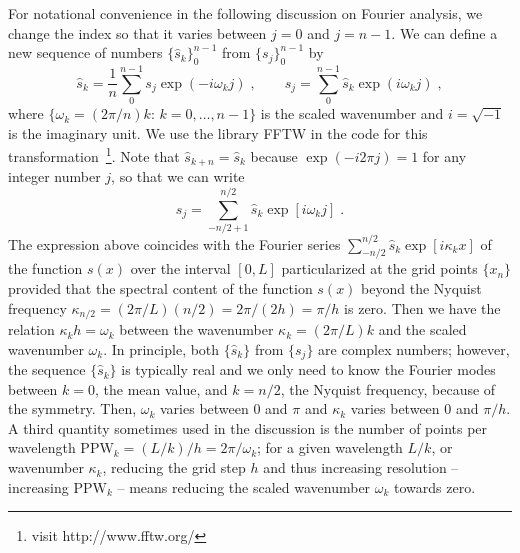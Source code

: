 For notational convenience in the following discussion on Fourier analysis, we change the index so that it varies between $j=0$ and $j=n-1$. We can define a new sequence of numbers $\{\hat{s}_k\}_0^{n-1}$ from $\{s_j\}_0^{n-1}$ by
\begin{equation}
\hat{s}_k=\frac{1}{n}\sum_0^{n-1}s_j\exp(-i\omega_kj)\;,\qquad
s_j=\sum_0^{n-1}\hat{s}_k\exp(i\omega_kj)\;,
\label{equ:dft}
\end{equation}
where $\{\omega_k=(2\pi/n)k:\, k = 0,\ldots,n-1\}$ is the scaled wavenumber and $i=\sqrt{-1}$ is the imaginary unit. We use the library FFTW in the code for this transformation~\footnote{visit {http://www.fftw.org/}}. Note that $\hat{s}_{k+n}=\hat{s}_k$ because $\exp(-i2\pi j)=1$ for any integer number $j$, so that we can write
\begin{equation}
  s_j =  \sum_{-n/2+1}^{n/2} \hat{s}_k \exp[i\omega_kj]\;.
\end{equation}
The expression above coincides with the Fourier series $\sum_{-n/2}^{n/2} \hat{s}_k \exp[i\kappa_kx]$ of the function $s(x)$ over the interval $[0,L]$ particularized at the grid points $\{x_n\}$ provided that the spectral content of the function $s(x)$ beyond the Nyquist frequency $\kappa_{n/2}=(2\pi/L)(n/2)=2\pi/(2h)=\pi/h$ is zero. Then we have the relation $\kappa_kh=\omega_k$ between the wavenumber $\kappa_k=(2\pi/L)k$ and the scaled wavenumber $\omega_k$. In principle, both $\{\hat{s}_k\}$ from $\{s_j\}$ are complex numbers; however, the sequence $\{\hat{s}_k\}$ is typically real and we only need to know the Fourier modes between $k=0$, the mean value, and $k=n/2$, the Nyquist frequency, because of the symmetry. Then, $\omega_k$ varies between 0 and $\pi$ and $\kappa_k$ varies between 0 and $\pi/h$. A third quantity sometimes used in the discussion is the number of points per wavelength $\mathrm{PPW}_k=(L/k)/h=2\pi/\omega_k$; for a given wavelength $L/k$, or wavenumber $\kappa_k$, reducing the grid step $h$ and thus increasing resolution -- increasing $\mathrm{PPW}_k$ -- means reducing the scaled wavenumber $\omega_k$ towards zero.


